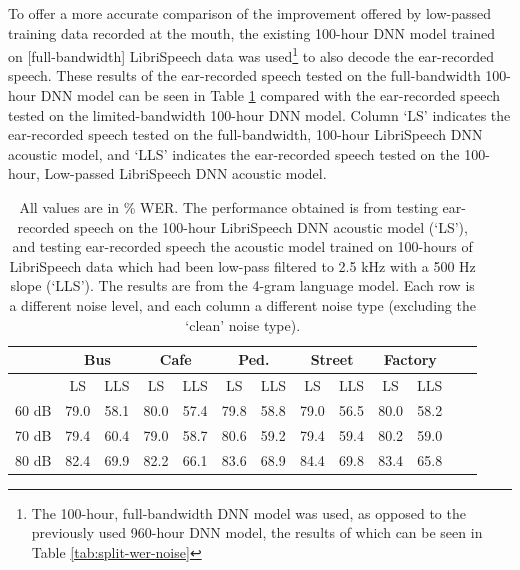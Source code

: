 To offer a more accurate comparison of the improvement offered by low-passed training data recorded at the mouth, the existing 100-hour DNN model trained on [full-bandwidth] LibriSpeech data was used\footnote{The 100-hour, full-bandwidth DNN model was used, as opposed to the previously used 960-hour DNN model, the results of which can be seen in Table \ref{tab:split-wer-noise}} to also decode the ear-recorded speech.  These results of the ear-recorded speech tested on the full-bandwidth 100-hour DNN model can be seen in Table \ref{tab:100HrDNNcmp} compared with the ear-recorded speech tested on the limited-bandwidth 100-hour DNN model.  Column `LS' indicates the ear-recorded speech tested on the full-bandwidth, 100-hour LibriSpeech DNN acoustic model, and `LLS' indicates the ear-recorded speech tested on the 100-hour, Low-passed LibriSpeech DNN acoustic model.

\begin{table}[h]
\begin{center}
\begin{tabular}{| c || c | c | c | c | c | c | c | c | c | c | c | c |} \hline
      & \multicolumn{2}{|c|}{Bus} & \multicolumn{2}{|c|}{Cafe} & \multicolumn{2}{|c|}{Ped.} & \multicolumn{2}{|c|}{Street} & \multicolumn{2}{|c|}{Factory} \\ \hline
      & LS & LLS & LS & LLS & LS & LLS & LS & LLS & LS & LLS \\ \hline\hline
60 dB & 79.0 & 58.1 & 80.0 & 57.4 & 79.8 & 58.8 & 79.0 & 56.5 & 80.0 & 58.2  \\ \hline
70 dB & 79.4 & 60.4 & 79.0 & 58.7 & 80.6 & 59.2 & 79.4 & 59.4 & 80.2 & 59.0  \\ \hline
80 dB & 82.4 & 69.9 & 82.2 & 66.1 & 83.6 & 68.9 & 84.4 & 69.8 & 83.4 & 65.8  \\ \hline
\end{tabular}
\end{center}
\caption{All values are in \% WER. The performance obtained is from testing ear-recorded speech on the 100-hour LibriSpeech DNN acoustic model (`LS'), and testing ear-recorded speech the acoustic model trained on 100-hours of LibriSpeech data which had been low-pass filtered to 2.5 kHz with a 500 Hz slope (`LLS').  The results are from the 4-gram language model.  Each row is a different noise level, and each column a different noise type (excluding the `clean' noise type).}\label{tab:100HrDNNcmp}
\end{table}

